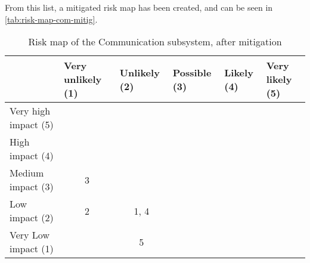 \noindent From this list, a mitigated risk map has been created, and can be seen in \autoref{tab:risk-map-com-mitig}.

\begin{table}[H]
\centering
\caption{Risk map of the Communication subsystem, after mitigation}
\label{tab:risk-map-com-mitig}\begin{tabular}{l|c|c|c|c|c|}
\cline{2-6}
& \multicolumn{1}{l|}{Very unlikely (1)} & \multicolumn{1}{l|}{Unlikely (2)} & \multicolumn{1}{l|}{Possible (3)} & \multicolumn{1}{l|}{Likely (4)} & \multicolumn{1}{l|}{Very likely (5)} \\ \hline
\multicolumn{1}{|l|}{Very high impact (5)} & \cellcolor{rm-3} & \cellcolor{rm-3} & \cellcolor{rm-3} & \cellcolor{rm-3} & \cellcolor{rm-3}\\ \hline 
\multicolumn{1}{|l|}{High impact (4)} & \cellcolor{rm-2} & \cellcolor{rm-2} & \cellcolor{rm-2} & \cellcolor{rm-3} & \cellcolor{rm-3}\\ \hline 
\multicolumn{1}{|l|}{Medium impact (3)} & \cellcolor{rm-0}3 & \cellcolor{rm-1} & \cellcolor{rm-1} & \cellcolor{rm-2} & \cellcolor{rm-3}\\ \hline 
\multicolumn{1}{|l|}{Low impact (2)} & \cellcolor{rm-0}2 & \cellcolor{rm-0}1, 4 & \cellcolor{rm-1} & \cellcolor{rm-2} & \cellcolor{rm-3}\\ \hline 
\multicolumn{1}{|l|}{Very Low impact (1)} & \cellcolor{rm-0} & \cellcolor{rm-0}5 & \cellcolor{rm-0} & \cellcolor{rm-2} & \cellcolor{rm-3}\\ \hline 
\end{tabular} 
\end{table}

